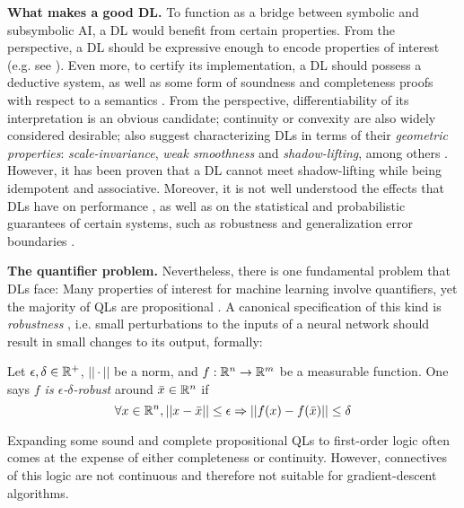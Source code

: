\textbf{What makes a good DL.} To function as a bridge between symbolic and subsymbolic AI, a DL would benefit from certain properties. From the \SiAI{} perspective, a DL should be expressive enough to encode properties of interest (e.g. see \mcita{}). Even more, to certify its implementation, a DL should possess a deductive system, as well as some form of soundness and completeness proofs with respect to a semantics \mcita{}. From the \SuAI{} perspective, differentiability of its interpretation is an obvious candidate; continuity or convexity are also widely considered desirable; \mcita{} also suggest characterizing DLs in terms of their \textit{geometric properties}: \emph{scale-invariance}, \emph{weak smoothness} and \emph{shadow-lifting}, among others \mcita{}. However, it has been proven that a DL cannot meet shadow-lifting while being idempotent and associative. Moreover, it is not well understood the effects that DLs have on performance \mcita{}, as well as on the statistical and probabilistic guarantees of certain systems, such as robustness \citep{casadio2022neural} and generalization error boundaries \citep{jakubovitz2019generalization}.


\textbf{The quantifier problem.} Nevertheless, there is one fundamental problem that DLs face: Many properties of interest for machine learning involve quantifiers, yet the majority of QLs are propositional \mcita{}. A canonical specification of this kind is  \textit{robustness} \mcita{},  i.e. small perturbations to the inputs of a neural network should result in small changes to its output, formally:
\begin{definition} %
\label{Robustness}%
    Let $\epsilon, \delta \in \mathbb{R}^+$, $||\cdot||$ be a norm, and $f : \mathbb{R}^n \rightarrow \mathbb{R}^m$ be a measurable function.
    One says \textit{$f$ is $\epsilon$-$\delta$-robust} around $\bar x \in \mathbb{R} ^ n$ if 
    \begin{equation}
    \label{eq:robustness}
        \forall x\in \mathbb{R}^n , ||x - \bar x|| \leq \epsilon \Rightarrow || 
			f(x) - f(\bar x)|| \leq \delta  
    \end{equation}
\end{definition}

Expanding some sound and complete propositional QLs to first-order logic often comes at the expense of either completeness or continuity.  
However, connectives of this logic are not continuous and therefore not suitable for gradient-descent algorithms.

